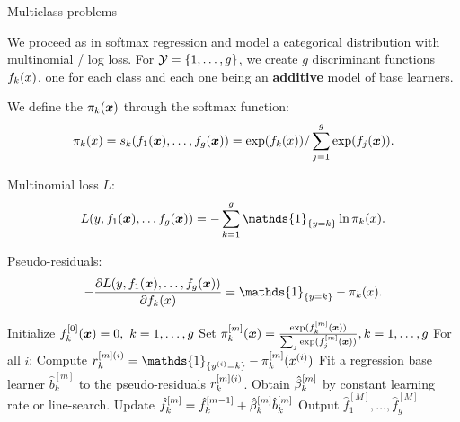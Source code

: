 \begin{vbframe}{Multiclass problems}

We proceed as in softmax regression and model a categorical distribution with multinomial / log loss.
For $\mathcal{Y} = \{1, \ldots, g\}$, we create $g$ discriminant functions $f_k(x)$, one for each class and each one being an \textbf{additive} model of base learners.

We define the $\pi_k(\bm{x})$ through the softmax function:
$$ \pi_k(x) = s_k(f_1(\bm{x}), \ldots, f_g(\bm{x})) = \exp(f_k(x)) / \sum_{j=1}^g \exp(f_j(\bm{x})). $$

Multinomial loss $L$:
$$ L(y, f_1(\xv), \ldots f_g(\xv)) = - \sumkg \mathds{1}_{\{y = k\}} \ln \pikx. $$

Pseudo-residuals:
$$-\fp{L(y, f_1(\xv), \ldots, f_g(\xv))}{\fxk} =  \mathds{1}_{\{y = k\}} - \pikx. $$


\framebreak

\begin{algorithm}[H]
  \begin{footnotesize}
  \begin{center}
  \caption{GB for Multiclass}
    \begin{algorithmic}[1]
      \State Initialize $f_{k}^{[0]}(\bm{x}) = 0,\ k = 1,\ldots,g$
      \State Set $\pi_k^{[m]}(\bm{x}) = \frac{\exp(f_k^{[m]}(\bm{x}))}{\sum_j \exp(f_j^{[m]}(\bm{x}))}, k = 1,\ldots,g$
            \State For all $i$: Compute $\rmi_k = \mathds{1}_{\{\yi = k\}} - \pik^{[m]}(\xi)$
              \State Fit a regression base learner $\hat{b}^{[m]}_k$ to the pseudo-residuals $r^{[m](i)}_k$.
              \State Obtain $\hat{\beta}^{[m]}_k$ by constant learning rate or line-search.
              \State Update $\hat{f}_k^{[m]} = \hat{f}_k^{[m-1]} + \hat{\beta}^{[m]}_k \hat{b}^{[m]}_k$
            \EndFor
      \EndFor
    \State Output $\hat{f}_1^{[M]}, \ldots, \hat{f}_g^{[M]}$
    \end{algorithmic}
    \end{center}
    \end{footnotesize}
\end{algorithm}

\end{vbframe}



\endlecture


